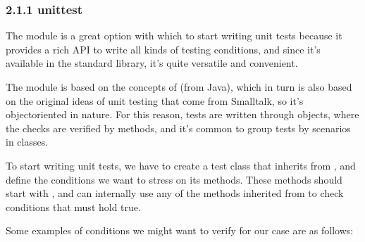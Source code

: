 \documentclass[a4paper,10pt,english]{sphinxmanual}
\begin{document}
\subsubsection{2.1.1 unittest}
\label{\detokenize{chapters/8_unit_testing/index:unittest}}
The  module is a great option with which to start writing unit tests because it
provides a rich API to write all kinds of testing conditions, and since it’s available in the
standard library, it’s quite versatile and convenient.

The  module is based on the concepts of  (from Java), which in turn is also
based on the original ideas of unit testing that come from Smalltalk, so it’s object\sphinxhyphen{}oriented in
nature. For this reason, tests are written through objects, where the checks are verified by
methods, and it’s common to group tests by scenarios in classes.

To start writing unit tests, we have to create a test class that inherits from
, and define the conditions we want to stress on its methods. These
methods should start with , and can internally use any of the methods inherited
from  to check conditions that must hold true.

Some examples of conditions we might want to verify for our case are as follows:
\end{document}
